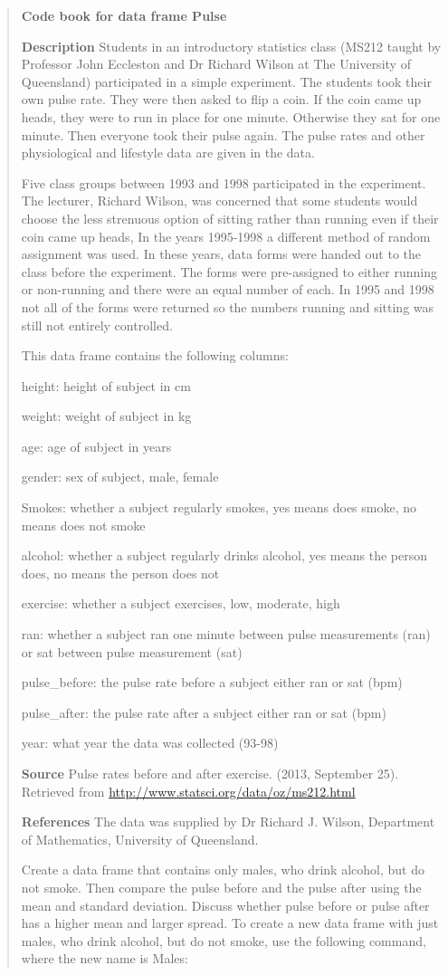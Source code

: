 \documentclass[]{book}
\begin{document}
\begin{quote}
\textbf{Code book for data frame Pulse}

\textbf{Description}
Students in an introductory statistics class (MS212 taught by Professor John Eccleston and Dr Richard Wilson at The University of Queensland) participated in a simple experiment. The students took their own pulse rate. They were then asked to flip a coin. If the coin came up heads, they were to run in place for one minute. Otherwise they sat for one minute. Then everyone took their pulse again. The pulse rates and other physiological and lifestyle data are given in the data.

Five class groups between 1993 and 1998 participated in the experiment. The lecturer, Richard Wilson, was concerned that some students would choose the less strenuous option of sitting rather than running even if their coin came up heads, In the years 1995-1998 a different method of random assignment was used. In these years, data forms were handed out to the class before the experiment. The forms were pre-assigned to either running or non-running and there were an equal number of each. In 1995 and 1998 not all of the forms were returned so the numbers running and sitting was still not entirely controlled.

This data frame contains the following columns:

height: height of subject in cm

weight: weight of subject in kg

age: age of subject in years

gender: sex of subject, male, female

Smokes: whether a subject regularly smokes, yes means does smoke, no means does not smoke

alcohol: whether a subject regularly drinks alcohol, yes means the person does, no means the person does not

exercise: whether a subject exercises, low, moderate, high

ran: whether a subject ran one minute between pulse measurements (ran) or sat between pulse measurement (sat)

pulse\_before: the pulse rate before a subject either ran or sat (bpm)

pulse\_after: the pulse rate after a subject either ran or sat (bpm)

year: what year the data was collected (93-98)

\textbf{Source}
Pulse rates before and after exercise. (2013, September 25). Retrieved from
\url{http://www.statsci.org/data/oz/ms212.html}

\textbf{References}
The data was supplied by Dr Richard J. Wilson, Department of Mathematics, University of Queensland.

Create a data frame that contains only males, who drink alcohol, but do not smoke. Then compare the pulse before and the pulse after using the mean and standard deviation. Discuss whether pulse before or pulse after has a higher mean and larger spread. To create a new data frame with just males, who drink alcohol, but do not smoke, use the following command, where the new name is Males:
\end{quote}
\end{document}

